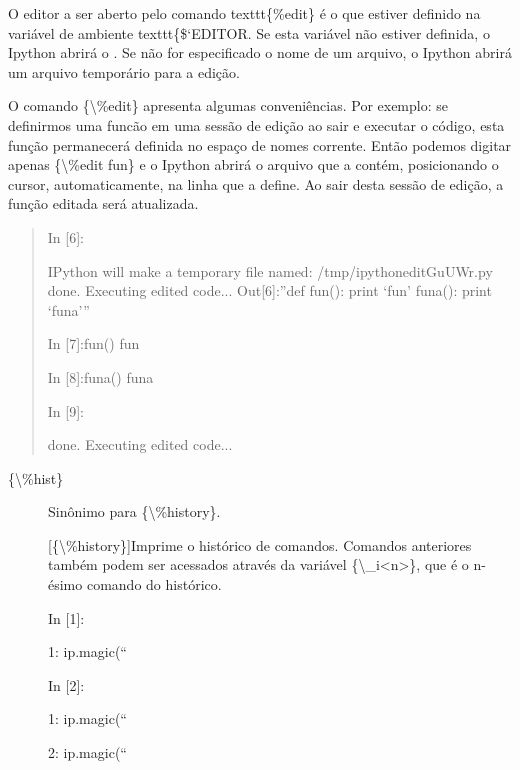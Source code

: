 \documentclass[a4paper,10pt,brazil]{sphinxmanual}
\begin{document}
O editor a ser aberto pelo comando texttt\{\%edit\} é o que estiver definido na variável de ambiente texttt\{\${}`EDITOR.
Se esta variável não estiver definida, o Ipython abrirá o .
Se não for especificado o nome de um arquivo, o Ipython abrirá um
arquivo temporário para a edição.

O comando \{\textbackslash{}\%edit\} apresenta algumas conveniências. Por exemplo:
se definirmos uma funcão  em uma sessão de edição ao sair e
executar o código, esta função permanecerá definida no espaço de
nomes corrente. Então podemos digitar apenas \{\textbackslash{}\%edit fun\} e o
Ipython abrirá o arquivo que a contém, posicionando o cursor,
automaticamente, na linha que a define. Ao sair desta sessão de
edição, a função editada será atualizada.
\begin{quote}

In {[}6{]}:

IPython will make a temporary file named: /tmp/ipythoneditGuUWr.py
done. Executing edited code... Out{[}6{]}:''def fun(): print `fun'
funa(): print `funa'''

In {[}7{]}:fun() fun

In {[}8{]}:funa() funa

In {[}9{]}:

done. Executing edited code...
\end{quote}
\begin{description}
\item[{\{\textbackslash{}\%hist\}}] \leavevmode
Sinônimo para \{\textbackslash{}\%history\}.

{[}\{\textbackslash{}\%history\}{]}Imprime o histórico de comandos. Comandos anteriores
também podem ser acessados através da variável \{\textbackslash{}\_i\textless{}n\textgreater{}\}, que é o
n-ésimo comando do histórico.

In {[}1{]}:

1: ip.magic(``

In {[}2{]}:

1: ip.magic(``

2: ip.magic(``

\end{description}
\end{document}
